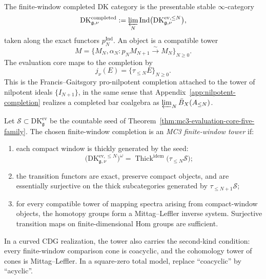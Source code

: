 \begin{definition}
\label{def:completed-dk-category}
%
%
The finite-window completed DK category is the presentable stable
$\infty$-category
\[
 \mathrm{DK}^{\mathrm{completed}}_{\mathfrak g,\nu}
 :=
 \varprojlim_N
 \operatorname{Ind}
 \bigl(
 \mathrm{DK}^{\mathrm{ev},\le N}_{\mathfrak g,\nu}
 \bigr),
\]
taken along the exact functors $p_N^{\operatorname{Ind}}$.  An object
is a compatible tower
\[
 M=\{M_N,\alpha_N:p_NM_{N+1}\xrightarrow{\sim}M_N\}_{N\ge0}.
\]
The evaluation core maps to the completion by
\[
 j_\nu(E)=\{\tau_{\le N}E\}_{N\ge0}.
\]
This is the Francis--Gaitsgory pro-nilpotent completion attached to
the tower of nilpotent ideals $\{I_{N+1}\}$, in the same sense that
Appendix~\ref{app:nilpotent-completion} realizes a completed bar
coalgebra as $\varprojlim_N\bar B_X(A_{\le N})$.
\end{definition}

\begin{definition}
\label{def:finite-window-mc3-tower}
%
Let $\mathcal S\subset\mathrm{DK}^{\mathrm{ev}}_{\mathfrak g}$ be
the countable seed of Theorem~\ref{thm:mc3-evaluation-core-five-family}.
The chosen finite-window completion is an \emph{MC3 finite-window
tower} if:
\begin{enumerate}[label=\textup{(FW\arabic*)},nosep]
\item each compact window is thickly generated by the seed:
 \[
 \bigl(
 \mathrm{DK}^{\mathrm{ev},\le N}_{\mathfrak g,\nu}
 \bigr)^\omega
 =
 \operatorname{Thick}^{\mathrm{idem}}
 \bigl(\tau_{\le N}\mathcal S\bigr);
 \]
\item the transition functors are exact, preserve compact objects,
 and are essentially surjective on the thick subcategories generated
 by $\tau_{\le N+1}\mathcal S$;
\item for every compatible tower of mapping spectra arising from
 compact-window objects, the homotopy groups form a
 Mittag--Leffler inverse system.  Surjective transition maps on
 finite-dimensional Hom groups are sufficient.
\end{enumerate}
In a curved CDG realization, the tower also carries the second-kind
condition: every finite-window comparison cone is coacyclic, and the
cohomology tower of cones is Mittag--Leffler.  In a square-zero total
model, replace ``coacyclic'' by ``acyclic''.
\end{definition}

